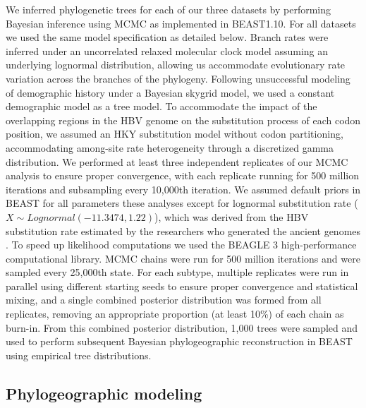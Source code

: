 We inferred phylogenetic trees for each of our three datasets by performing Bayesian inference using MCMC as implemented in BEAST1.10. %
For all datasets we used the same model specification as detailed below.
Branch rates were inferred under an uncorrelated relaxed molecular clock model assuming an underlying lognormal distribution, allowing us accommodate evolutionary rate variation across the branches of the phylogeny.
Following unsuccessful modeling of demographic history under a Bayesian skygrid model, we used a constant demographic model as a tree model. %
To accommodate the impact of the overlapping regions in the HBV genome on the substitution process of each codon position, we assumed an HKY substitution model without codon partitioning, accommodating among-site rate heterogeneity through a discretized gamma distribution. %
We performed at least three independent replicates of our MCMC analysis to ensure proper convergence, with each replicate running for 500 million iterations and subsampling every 10,000th iteration. %
We assumed default priors in BEAST for all parameters these analyses except for lognormal substitution rate ($X \sim Lognormal(-11.3474,1.22)$), %
which was derived from the HBV substitution rate estimated by the researchers who generated the ancient genomes \cite{muhlemann}.
To speed up likelihood computations we used the BEAGLE 3 high-performance computational library.
MCMC chains were run for 500 million iterations and were sampled every 25,000th state.
For each subtype, multiple replicates were run in parallel using different starting seeds to ensure proper convergence and statistical mixing, and a single combined posterior distribution was formed from all replicates, removing an appropriate proportion (at least 10\%) of each chain as burn-in.
From this combined posterior distribution, 1,000 trees were sampled and used to perform subsequent Bayesian phylogeographic reconstruction in BEAST using empirical tree distributions. %


\subsection{Phylogeographic modeling}

